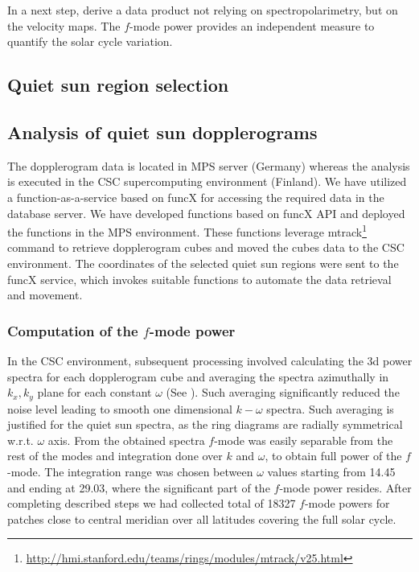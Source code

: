 \documentclass{aa}
\begin{document}
In a next step, derive a data product not relying on spectropolarimetry, but on the \los{} velocity maps. The $f$-mode power provides an independent measure to quantify the solar cycle variation.




\subsection{Quiet sun region selection}

\subsection{Analysis of quiet sun dopplerograms}
The dopplerogram data is located in MPS server (Germany) whereas the analysis is executed in the CSC supercomputing environment (Finland). We have utilized  a function-as-a-service based on funcX \cite[]{chard20funcx} for accessing the required data in the database server. We have developed functions based on funcX API and deployed the functions in the MPS environment. These functions leverage mtrack\footnote{\url{http://hmi.stanford.edu/teams/rings/modules/mtrack/v25.html}} command to retrieve dopplerogram cubes and moved the cubes data to the CSC environment. The coordinates of the selected quiet sun regions were sent to the funcX service, which invokes suitable functions to automate the data retrieval and movement.

\subsubsection*{Computation of the $f$-mode power}

In the CSC environment, subsequent processing involved calculating the 3d power spectra for each dopplerogram cube and averaging the spectra azimuthally in $k_x, k_y$ plane for each constant $\omega$ (See ). Such averaging significantly reduced the noise level leading to smooth one dimensional $k-\omega$ spectra. Such averaging is justified for the quiet sun spectra, as the ring diagrams are radially symmetrical w.r.t. $\omega$ axis. From the obtained spectra $f$-mode was easily separable from the rest of the modes and integration done over $k$ and $\omega$, to obtain full power of the $f$-mode. The integration range was chosen between $\omega$ values starting from 14.45 and ending at 29.03, where the significant part of the $f$-mode power resides. After completing described steps we had collected total of 18327 $f$-mode powers for patches close to central meridian over all latitudes covering the full solar cycle.
\end{document}
